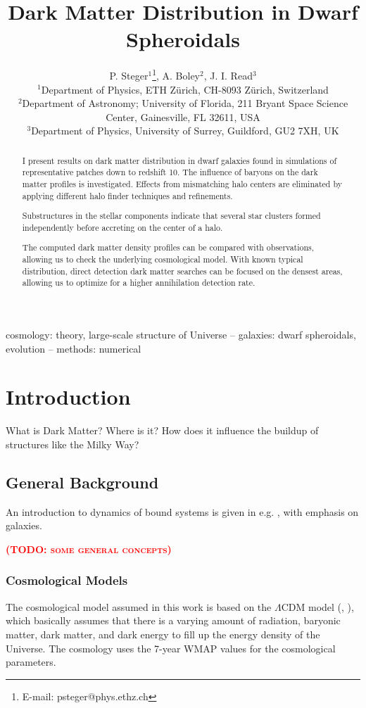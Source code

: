 \documentclass[useAMS,usenatbib]{mn2e}
\title[Dark Matter Distribution in Dwarf Spheroidals]
     {Dark Matter Distribution in Dwarf Spheroidals}
\author[P. Steger et al.]{P. Steger$^{1}$\thanks{E-mail: psteger@phys.ethz.ch},
 A. Boley$^{2}$,
 J. I. Read$^{3}$\\
 $^{1}$Department of Physics, ETH Z\"urich, CH-8093 Z\"urich,
 Switzerland\\
 $^{2}$Department of Astronomy; University of Florida, 211 Bryant
 Space Science Center, Gainesville, FL 32611, USA\\
 $^{3}$Department of Physics, University of Surrey, Guildford, GU2 7XH, UK
}
\newcommand{\TODO}[1]{\textsc{\textbf{\textcolor{red}{(TODO: #1)}}}}
\begin{document}
\maketitle

\label{firstpage}
\begin{abstract}
    I present results on dark matter distribution in dwarf galaxies
    found in simulations of representative patches down to redshift
    10. The influence of baryons on the dark matter profiles is
    investigated. Effects from mismatching halo centers are eliminated
    by applying different halo finder techniques and refinements.

    Substructures in the stellar components indicate that several star
    clusters formed independently before accreting on the center of a
    halo.

    The computed dark matter density profiles can be compared with
    observations, allowing us to check the underlying cosmological
    model. With known typical distribution, direct detection dark
    matter searches can be focused on the densest areas, allowing us
    to optimize for a higher annihilation detection rate.
\end{abstract}

\begin{keywords}
 cosmology: theory, large-scale structure of Universe --
 galaxies: dwarf spheroidals, evolution --
 methods: numerical
\end{keywords}

\section{Introduction}
\label{sec:intro}
What is Dark Matter? Where is it? How does it influence the buildup of
structures like the Milky Way?

\subsection{General Background}
An introduction to dynamics of bound systems is given in
e.g. \cite{Binney2008}, with emphasis on galaxies.


\TODO{some general concepts}

\subsubsection{Cosmological Models}
The cosmological model assumed in this work is based on the
$\Lambda$CDM model (\cite{Weinberg2008}, \cite{Peacock1999}), which
basically assumes that there is a varying amount of radiation,
baryonic matter, dark matter, and dark energy to fill up the energy
density of the Universe. The cosmology uses the 7-year WMAP values
\citep{Komatsu+2011} for the cosmological parameters.
\end{document}
